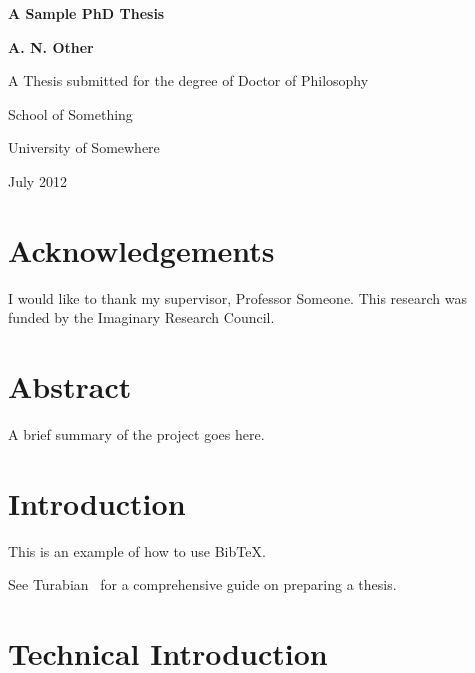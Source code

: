 \documentclass[oneside,12pt]{scrbook}
\theoremstyle{break}
\begin{document}
\begin{titlepage}
\centering
\vspace*{1in}
\begin{Large}\bfseries
A Sample PhD Thesis\par
\end{Large}
\vspace{1.5in}
\begin{large}\bfseries
A. N. Other\par
\end{large}
\vfill
A Thesis submitted for the degree of Doctor of Philosophy
\par
\vspace{0.5in}
School of Something
\par
University of Somewhere
\par
\vspace{0.5in}
July 2012
\par
\end{titlepage}

\doublespacing

\frontmatter
\tableofcontents
\listoffigures
\listoftables
\lstlistoflistings

\chapter{Acknowledgements}

I would like to thank my supervisor, Professor Someone. This
research was funded by the Imaginary Research Council.

\chapter{Abstract}

A brief summary of the project goes here.

\mainmatter

\chapter{Introduction}
\label{ch:intro}

This is an example of how to use Bib\TeX.

See Turabian~\cite{turabian96} for a comprehensive guide on
preparing a thesis.


\chapter{Technical Introduction}
\label{ch:techintro}
\end{document}

